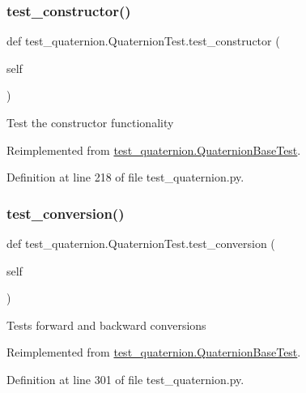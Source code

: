 \subsubsection{\texorpdfstring{test\_constructor()}{test\_constructor()}}
{\footnotesize\ttfamily def test\+\_\+quaternion.\+Quaternion\+Test.\+test\+\_\+constructor (\begin{DoxyParamCaption}\item[{}]{self }\end{DoxyParamCaption})}

\begin{DoxyVerb}Test the constructor functionality\end{DoxyVerb}
 

Reimplemented from \mbox{\hyperlink{classtest__quaternion_1_1QuaternionBaseTest_ada2ac60d65452ed38427e5eb13e4b7f8}{test\+\_\+quaternion.\+Quaternion\+Base\+Test}}.



Definition at line 218 of file test\+\_\+quaternion.\+py.

\mbox{\label{classtest__quaternion_1_1QuaternionTest_ae80f7e08845739c1d36595842c0f1424}} 
\subsubsection{\texorpdfstring{test\_conversion()}{test\_conversion()}}
{\footnotesize\ttfamily def test\+\_\+quaternion.\+Quaternion\+Test.\+test\+\_\+conversion (\begin{DoxyParamCaption}\item[{}]{self }\end{DoxyParamCaption})}

\begin{DoxyVerb}Tests forward and backward conversions
\end{DoxyVerb}
 

Reimplemented from \mbox{\hyperlink{classtest__quaternion_1_1QuaternionBaseTest_aefec8631d39a6ad0e62bf416e9806c20}{test\+\_\+quaternion.\+Quaternion\+Base\+Test}}.



Definition at line 301 of file test\+\_\+quaternion.\+py.

\mbox{\label{classtest__quaternion_1_1QuaternionTest_ad4f17f223c6e6583af904198eafb7fcf}} 
